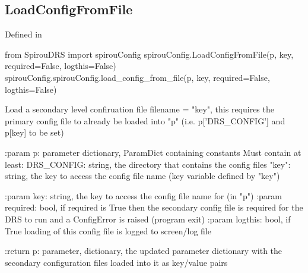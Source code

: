 \begin{minipage}{\textwidth}
\subsection{LoadConfigFromFile}

Defined in \spirouConfig{}

\begin{pythonbox}
from SpirouDRS import spirouConfig
spirouConfig.LoadConfigFromFile(p, key, required=False, logthis=False)
spirouConfig.spirouConfig.load_config_from_file(p, key, required=False, logthis=False)
\end{pythonbox}

\begin{pythondocstring}
Load a secondary level confiruation file filename = "key", this requires
the primary config file to already be loaded into "p"
(i.e. p['DRS_CONFIG'] and p[key] to be set)

:param p: parameter dictionary, ParamDict containing constants
    Must contain at least:
            DRS_CONFIG: string, the directory that contains the config files
            "key": string, the key to access the config file name
                   (key variable defined by "key")

:param key: string, the key to access the config file name for (in "p")
:param required: bool, if required is True then the secondary config file
                 is required for the DRS to run and a ConfigError is raised
                 (program exit)
:param logthis: bool, if True loading of this config file is logged to
                screen/log file

:return p: parameter, dictionary, the updated parameter dictionary with
           the secondary configuration files loaded into it as key/value
           pairs
\end{pythondocstring}
\end{minipage}

